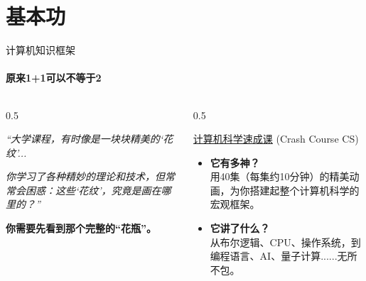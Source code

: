 \documentclass{beamer}
\newcommand{\hrefcol}[2]{\textcolor{cyan}{\href{#1}{#2}}}
\begin{document}
\section{基本功}
\begin{frame}{计算机知识框架}
    \framesubtitle{原来1+1可以不等于2}
    \begin{columns}[T]
        \begin{column}{0.5\textwidth}
            \vspace{0.3cm}
            
            \textit{“大学课程，有时像是一块块精美的‘花纹’...}
            
            \textit{你学习了各种精妙的理论和技术，但常常会困惑：这些‘花纹’，究竟是画在哪里的？”}
            
            \vspace{0.5cm}
            \Large
            \textbf{你需要先看到那个完整的“花瓶”。}

        \end{column}
        
        \begin{column}{0.5\textwidth}
            \begin{center}
                \huge \hrefcol{https://www.bilibili.com/video/BV1EW411u7th/}{计算机科学速成课}
                \large (Crash Course CS)
            \end{center}
            
            \begin{itemize}
                \item \textbf{它有多神？} \\
                用40集（每集约10分钟）的精美动画，为你搭建起整个计算机科学的宏观框架。
                
                \item  \textbf{它讲了什么？} \\
                从布尔逻辑、CPU、操作系统，到编程语言、AI、量子计算......无所不包。
            \end{itemize}
        \end{column}
    \end{columns}


\end{frame}
\end{document}
